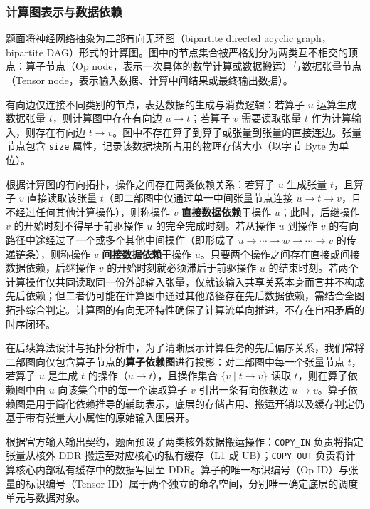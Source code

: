 \documentclass[anonymous,withtoc]{gmcm2026}
\begin{document}
\subsubsection{计算图表示与数据依赖}

题面将神经网络抽象为二部有向无环图（bipartite directed acyclic graph，bipartite DAG）形式的计算图。图中的节点集合被严格划分为两类互不相交的顶点：算子节点（Op node，表示一次具体的数学计算或数据搬运）与数据张量节点（Tensor node，表示输入数据、计算中间结果或最终输出数据）。

有向边仅连接不同类别的节点，表达数据的生成与消费逻辑：若算子 \(u\) 运算生成数据张量 \(t\)，则计算图中存在有向边 \(u \to t\)；若算子 \(v\) 需要读取张量 \(t\) 作为计算输入，则存在有向边 \(t \to v\)。图中不存在算子到算子或张量到张量的直接连边。张量节点包含 \texttt{size} 属性，记录该数据块所占用的物理存储大小（以字节 Byte 为单位）。

根据计算图的有向拓扑，操作之间存在两类依赖关系：若算子 \(u\) 生成张量 \(t\)，且算子 \(v\) 直接读取该张量 \(t\)（即二部图中仅通过单一中间张量节点连接 \(u \to t \to v\)，且不经过任何其他计算操作），则称操作 \(v\) \textbf{直接数据依赖}于操作 \(u\)；此时，后继操作 \(v\) 的开始时刻不得早于前驱操作 \(u\) 的完全完成时刻。若从操作 \(u\) 到操作 \(v\) 的有向路径中途经过了一个或多个其他中间操作（即形成了 \(u \to \cdots \to w \to \cdots \to v\) 的传递链条），则称操作 \(v\) \textbf{间接数据依赖}于操作 \(u\)。只要两个操作之间存在直接或间接数据依赖，后继操作 \(v\) 的开始时刻就必须滞后于前驱操作 \(u\) 的结束时刻。若两个计算操作仅共同读取同一份外部输入张量，仅就该输入共享关系本身而言并不构成先后依赖；但二者仍可能在计算图中通过其他路径存在先后数据依赖，需结合全图拓扑综合判定。计算图的有向无环特性确保了计算流单向推进，不存在自相矛盾的时序闭环。

在后续算法设计与拓扑分析中，为了清晰展示计算任务的先后偏序关系，我们常将二部图向仅包含算子节点的\textbf{算子依赖图}进行投影：对二部图中每一个张量节点 \(t\)，若算子 \(u\) 是生成 \(t\) 的操作（\(u \to t\)），且操作集合 \(\{v \mid t \to v\}\) 读取 \(t\)，则在算子依赖图中由 \(u\) 向该集合中的每一个读取算子 \(v\) 引出一条有向依赖边 \(u \to v\)。算子依赖图是用于简化依赖推导的辅助表示，底层的存储占用、搬运开销以及缓存判定仍基于带有张量大小属性的原始输入图展开。

根据官方输入输出契约，题面预设了两类核外数据搬运操作：\texttt{COPY\_IN} 负责将指定张量从核外 DDR 搬运至对应核心的私有缓存（L1 或 UB）；\texttt{COPY\_OUT} 负责将计算核心内部私有缓存中的数据写回至 DDR。算子的唯一标识编号（Op ID）与张量的标识编号（Tensor ID）属于两个独立的命名空间，分别唯一确定底层的调度单元与数据对象。
\end{document}
